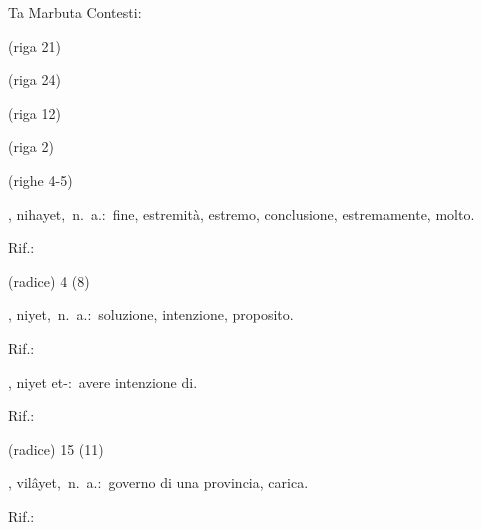 \begin{glossario}{Ta Marbuta}
Contesti:
\begin{subvocedue}
\item[(riga 21)] 
\item[(riga 24)] 
\item[(riga 12)] 
\item[(riga 2)] 
\item[(righe 4-5)] 
\end{subvocedue}
\item[{\color{colorlowref}\spzrl{nihAyaT}},] {\sf nihayet},\ n.\ a.:\ fine, estremità, estremo, conclusione, estremamente, molto.
\begin{subvocedue}
\item[Rif.:] 
\end{subvocedue}
\begin{subvocedue}
\item[(radice)]   4 (8)
\end{subvocedue}
\item[{\color{colorlowref}\spzrl{niyyaT}},] {\sf niyet},\ n.\ a.:\ soluzione, intenzione, proposito.
\begin{subvocedue}
\item[Rif.:] 
\end{subvocedue}
\begin{subvocedue}
\item[\subglossariobullet] , {\sf niyet et-}:\ avere intenzione di.
\begin{subvocedue}
\item[Rif.:] 
\end{subvocedue}
\item[(radice)]   15 (11)
\end{subvocedue}
\item[{\color{colorlowref}\spzrl{wilAyat}},] {\sf vilâyet},\ n.\ a.:\ governo di una provincia, carica.
\begin{subvocedue}
\item[Rif.:] 
\end{subvocedue}
\begin{subvocedue}

\end{subvocedue}
\end{glossario}
